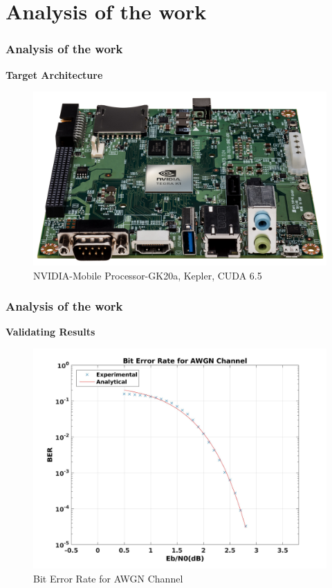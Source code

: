 \documentclass{beamer}
\begin{document}
\begin{frame}
\end{frame}

\section{Analysis of the work}

\begin{frame}
  \frametitle{Analysis of the work}
  \textbf{Target Architecture}
    \begin{figure}[h]
\begin{centering}
\includegraphics[scale=0.08]{img/Jetson_TK1.jpg}
\caption[width=.3\textwidth]{NVIDIA-Mobile Processor-GK20a, Kepler, CUDA 6.5}
\end{centering}
\end{figure}
  \end{frame}
\begin{frame}
  \frametitle{Analysis of the work}
  \textbf{Validating Results}
  
    \begin{figure}[h]
\begin{centering}
\includegraphics[scale=0.08]{img/BER.jpg}
\caption[width=.3\textwidth]{Bit Error Rate for AWGN Channel}
\end{centering}
\end{figure}
  \end{frame}
\end{document}
